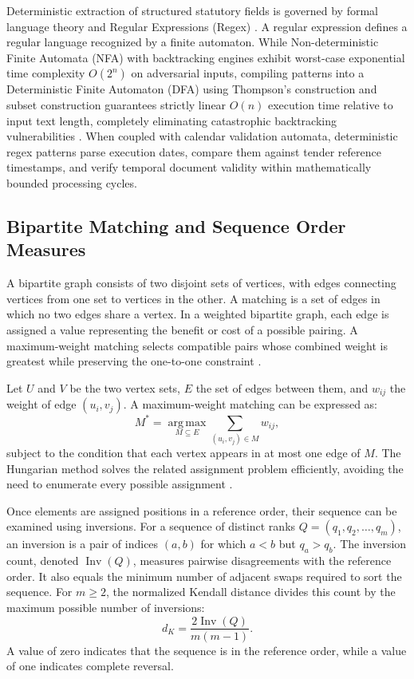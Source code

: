 Deterministic extraction of structured statutory fields is governed by formal language theory and Regular Expressions (Regex) \cite{ref25}.
A regular expression defines a regular language recognized by a finite automaton.
While Non-deterministic Finite Automata (NFA) with backtracking engines exhibit worst-case exponential time complexity $O(2^n)$ on adversarial inputs, compiling patterns into a Deterministic Finite Automaton (DFA) using Thompson's construction and subset construction guarantees strictly linear $O(n)$ execution time relative to input text length, completely eliminating catastrophic backtracking vulnerabilities \cite{ref25, ref26}.
When coupled with calendar validation automata, deterministic regex patterns parse execution dates, compare them against tender reference timestamps, and verify temporal document validity within mathematically bounded processing cycles.

\subsection{Bipartite Matching and Sequence Order Measures}
\label{sec:matching_sequence_theory}

A bipartite graph consists of two disjoint sets of vertices, with edges connecting vertices from one set to vertices in the other.
A matching is a set of edges in which no two edges share a vertex.
In a weighted bipartite graph, each edge is assigned a value representing the benefit or cost of a possible pairing.
A maximum-weight matching selects compatible pairs whose combined weight is greatest while preserving the one-to-one constraint \cite{docxa6}.

Let $U$ and $V$ be the two vertex sets, $E$ the set of edges between them, and $w_{ij}$ the weight of edge $(u_i, v_j)$.
A maximum-weight matching can be expressed as:
\begin{equation}
\label{eq:theory_bipartite_matching}
M^* = \operatorname*{arg\,max}_{M \subseteq E} \sum_{(u_i, v_j) \in M} w_{ij},
\end{equation}
subject to the condition that each vertex appears in at most one edge of $M$.
The Hungarian method solves the related assignment problem efficiently, avoiding the need to enumerate every possible assignment \cite{docxa6}.

Once elements are assigned positions in a reference order, their sequence can be examined using inversions.
For a sequence of distinct ranks $Q = (q_1, q_2, \ldots, q_m)$, an inversion is a pair of indices $(a, b)$ for which $a < b$ but $q_a > q_b$.
The inversion count, denoted $\operatorname{Inv}(Q)$, measures pairwise disagreements with the reference order.
It also equals the minimum number of adjacent swaps required to sort the sequence.
For $m \ge 2$, the normalized Kendall distance divides this count by the maximum possible number of inversions:
\begin{equation}
\label{eq:theory_kendall_distance}
d_K = \frac{2\operatorname{Inv}(Q)}{m(m-1)}.
\end{equation}
A value of zero indicates that the sequence is in the reference order, while a value of one indicates complete reversal.

